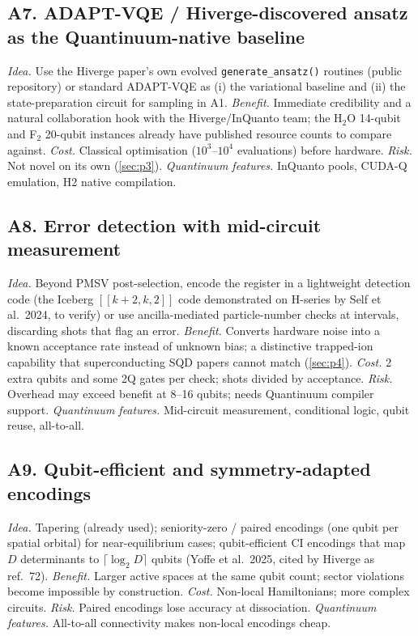 \documentclass[11pt,a4paper]{article}
\begin{document}
\subsection*{A7. ADAPT-VQE / Hiverge-discovered ansatz as the Quantinuum-native baseline}
\emph{Idea.} Use the Hiverge paper's own evolved \texttt{generate\_ansatz()} routines (public repository) or standard ADAPT-VQE as (i) the variational baseline and (ii) the state-preparation circuit for sampling in A1. \emph{Benefit.} Immediate credibility and a natural collaboration hook with the Hiverge/InQuanto team; the H$_2$O 14-qubit and F$_2$ 20-qubit instances already have published resource counts to compare against. \emph{Cost.} Classical optimisation ($10^3$--$10^4$ evaluations) before hardware. \emph{Risk.} Not novel on its own (\cref{sec:p3}). \emph{Quantinuum features.} InQuanto pools, CUDA-Q emulation, H2 native compilation.

\subsection*{A8. Error detection with mid-circuit measurement}
\emph{Idea.} Beyond PMSV post-selection, encode the register in a lightweight detection code (the Iceberg $[[k+2,k,2]]$ code demonstrated on H-series by Self et al.\ 2024, to verify) or use ancilla-mediated particle-number checks at intervals, discarding shots that flag an error. \emph{Benefit.} Converts hardware noise into a known acceptance rate instead of unknown bias; a distinctive trapped-ion capability that superconducting SQD papers cannot match (\cref{sec:p4}). \emph{Cost.} 2 extra qubits and some 2Q gates per check; shots divided by acceptance. \emph{Risk.} Overhead may exceed benefit at 8--16 qubits; needs Quantinuum compiler support. \emph{Quantinuum features.} Mid-circuit measurement, conditional logic, qubit reuse, all-to-all.

\subsection*{A9. Qubit-efficient and symmetry-adapted encodings}
\emph{Idea.} Tapering (already used); seniority-zero / paired encodings (one qubit per spatial orbital) for near-equilibrium cases; qubit-efficient CI encodings that map $D$ determinants to $\lceil\log_2D\rceil$ qubits (Yoffe et al.\ 2025, cited by Hiverge as ref.~72). \emph{Benefit.} Larger active spaces at the same qubit count; sector violations become impossible by construction. \emph{Cost.} Non-local Hamiltonians; more complex circuits. \emph{Risk.} Paired encodings lose accuracy at dissociation. \emph{Quantinuum features.} All-to-all connectivity makes non-local encodings cheap.
\end{document}
